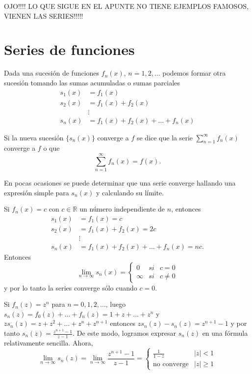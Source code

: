 OJO!!!! LO QUE SIGUE EN EL APUNTE NO TIENE EJEMPLOS FAMOSOS, VIENEN LAS SERIES!!!!!

\section{Series de funciones}
Dada una sucesión de funciones $f_n(x)$, $n=1,2,\dots$ podemos formar otra sucesión tomando las sumas acumuladas o
sumas parciales
\[
\begin{split}
s_1(x)&=f_1(x)
\\
s_2(x)&=f_1(x)+f_2(x)
\\
&\vdots
\\
s_n(x)&=f_1(x)+f_2(x)+\dots+f_n(x)
\end{split}
\]

Si la nueva sucesión $\{s_n(x)\}$ converge a $f$ se dice que la serie $\sum\limits_{n=1}^{\infty} f_n(x)$
converge a $f$ o que 
\[
\sum\limits_{n=1}^{\infty} f_n(x)=f(x).
\]

En pocas ocasiones se puede determinar que una serie converge hallando una expresión simple para $s_n(x)$ y
calculando su límite.

\begin{ejemplo}
Si $f_n(x)=c$ con $c \in \mathbb{R}$ un número independiente de $n$, entonces
\[
\begin{split}
s_1(x)&=f_1(x)=c
\\
s_2(x)&=f_1(x)+f_2(x)=2c
\\
&\vdots
\\
s_n(x)&=f_1(x)+f_2(x)+\dots+f_n(x)=nc.
\end{split}
\]
Entonces
\[
\lim\limits_{n \to \infty} s_n(x)=
\left\{
\begin{array}{lll}
0&si&c=0
\\
\infty&si&c\neq 0
\end{array}
\right.
\]
y por lo tanto la series converge sólo cuando $c=0$.
\end{ejemplo}

\begin{ejemplo}
Si $f_n(z)=z^n$ para $n=0,1,2,\dots$, luego 
$s_n(z)=f_0(z)+\dots+f_n(z)=1+z+\dots+z^n$ y $zs_n(z)=z+z^2+\dots+z^n+z^{n+1}$ entonces
$zs_n(z)-s_n(z)=z^{n+1}-1$ y por tanto $s_n(z)=\frac{z^{n+1}-1}{z-1}$.
De este modo, logramos expresar $s_n(z)$ en una fórmula relativamente sencilla. Ahora, 
\[
\lim\limits_{n \to \infty} s_n(z)=
\lim\limits_{n \to \infty} \frac{z^{n+1}-1}{z-1}=
\left\{\begin{array}{ll}
\frac{1}{1-z}&|z|<1
\\
\mbox{no converge}&|z|\geq 1
\end{array}
\right.
\]
\end{ejemplo}

